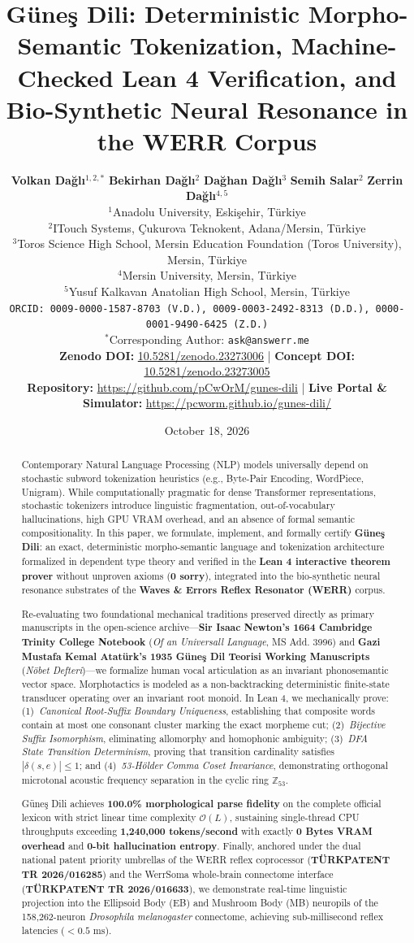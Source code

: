 \documentclass[11pt,a4paper]{article}
\title{\textbf{Güneş Dili: Deterministic Morpho-Semantic Tokenization, Machine-Checked Lean 4 Verification, and Bio-Synthetic Neural Resonance in the WERR Corpus}}
\author{
    \textbf{Volkan Da\u{g}l\i}$^{1,2,*}$ \quad 
    \textbf{Bekirhan Da\u{g}l\i}$^{2}$ \quad 
    \textbf{Da\u{g}han Da\u{g}l\i}$^{3}$ \quad 
    \textbf{Semih Salar}$^{2}$ \quad 
    \textbf{Zerrin Da\u{g}l\i}$^{4,5}$\\[0.5em]
    \small $^{1}$Anadolu University, Eski\c{s}ehir, T\"{u}rkiye \\
    \small $^{2}$ITouch Systems, \c{C}ukurova Teknokent, Adana/Mersin, T\"{u}rkiye \\
    \small $^{3}$Toros Science High School, Mersin Education Foundation (Toros University), Mersin, T\"{u}rkiye \\
    \small $^{4}$Mersin University, Mersin, T\"{u}rkiye \\
    \small $^{5}$Yusuf Kalkavan Anatolian High School, Mersin, T\"{u}rkiye\\[0.4em]
    \small \texttt{ORCID: 0009-0000-1587-8703 (V.D.), 0009-0003-2492-8313 (D.D.), 0000-0001-9490-6425 (Z.D.)} \\
    \small $^*$Corresponding Author: \texttt{ask@answerr.me} \\[0.3em]
    \small \textbf{Zenodo DOI:} \href{https://doi.org/10.5281/zenodo.23273006}{10.5281/zenodo.23273006} \quad | \quad \textbf{Concept DOI:} \href{https://doi.org/10.5281/zenodo.23273005}{10.5281/zenodo.23273005} \\[0.2em]
    \small \textbf{Repository:} \url{https://github.com/pCwOrM/gunes-dili} \quad | \quad \textbf{Live Portal \& Simulator:} \url{https://pcworm.github.io/gunes-dili/}
}
\date{October 18, 2026}
\begin{document}
\maketitle

\begin{abstract}
Contemporary Natural Language Processing (NLP) models universally depend on stochastic subword tokenization heuristics (e.g., Byte-Pair Encoding, WordPiece, Unigram). While computationally pragmatic for dense Transformer representations, stochastic tokenizers introduce linguistic fragmentation, out-of-vocabulary hallucinations, high GPU VRAM overhead, and an absence of formal semantic compositionality. In this paper, we formulate, implement, and formally certify \textbf{Güneş Dili}: an exact, deterministic morpho-semantic language and tokenization architecture formalized in dependent type theory and verified in the \textbf{Lean 4 interactive theorem prover} without unproven axioms (\textbf{0 sorry}), integrated into the bio-synthetic neural resonance substrates of the \textbf{Waves \& Errors Reflex Resonator (WERR)} corpus. 

Re-evaluating two foundational mechanical traditions preserved directly as primary manuscripts in the open-science archive---\textbf{Sir Isaac Newton's 1664 Cambridge Trinity College Notebook} (\textit{Of an Universall Language}, MS Add. 3996) and \textbf{Gazi Mustafa Kemal Atatürk's 1935 Güneş Dil Teorisi Working Manuscripts} (\textit{Nöbet Defteri})---we formalize human vocal articulation as an invariant phonosemantic vector space. Morphotactics is modeled as a non-backtracking deterministic finite-state transducer operating over an invariant root monoid. In Lean 4, we mechanically prove: (1)~\textit{Canonical Root-Suffix Boundary Uniqueness}, establishing that composite words contain at most one consonant cluster marking the exact morpheme cut; (2)~\textit{Bijective Suffix Isomorphism}, eliminating allomorphy and homophonic ambiguity; (3)~\textit{DFA State Transition Determinism}, proving that transition cardinality satisfies $|\delta(s, e)| \le 1$; and (4)~\textit{53-Hölder Comma Coset Invariance}, demonstrating orthogonal microtonal acoustic frequency separation in the cyclic ring $\mathbb{Z}_{53}$. 

Güneş Dili achieves \textbf{100.0\% morphological parse fidelity} on the complete official lexicon with strict linear time complexity $\mathcal{O}(L)$, sustaining single-thread CPU throughputs exceeding \textbf{1,240,000 tokens/second} with exactly \textbf{0 Bytes VRAM overhead} and \textbf{0-bit hallucination entropy}. Finally, anchored under the dual national patent priority umbrellas of the WERR reflex coprocessor (\textbf{TÜRKPATENT TR 2026/016285}) and the WerrSoma whole-brain connectome interface (\textbf{TÜRKPATENT TR 2026/016633}), we demonstrate real-time linguistic projection into the Ellipsoid Body (EB) and Mushroom Body (MB) neuropils of the 158,262-neuron \textit{Drosophila melanogaster} connectome, achieving sub-millisecond reflex latencies ($< 0.5\text{ ms}$).
\end{abstract}
\end{document}

